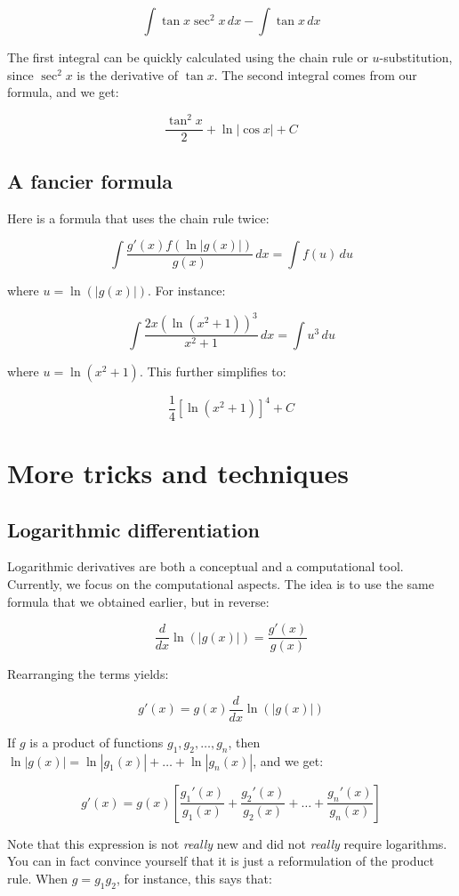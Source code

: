 \documentclass[10pt]{amsart}
\begin{document}
$$\int \tan x \sec^2x \, dx - \int \tan x \, dx$$

The first integral can be quickly calculated using the chain rule or
$u$-substitution, since $\sec^2 x$ is the derivative of $\tan x$. The
second integral comes from our formula, and we get:

$$\frac{\tan^2 x}{2} + \ln|\cos x| + C$$

\subsection{A fancier formula}

Here is a formula that uses the chain rule twice:

$$\int \frac{g'(x)f(\ln|g(x)|)}{g(x)} \, dx = \int f(u) \, du$$

where $u = \ln(|g(x)|)$. For instance:

$$\int \frac{2x(\ln(x^2 + 1))^3}{x^2 + 1} \, dx = \int u^3 \, du$$

where $u = \ln(x^2 + 1)$. This further simplifies to:

$$\frac{1}{4}[\ln(x^2 + 1)]^4 + C$$

\section{More tricks and techniques}

\subsection{Logarithmic differentiation}

Logarithmic derivatives are both a conceptual and a computational
tool. Currently, we focus on the computational aspects. The idea is to
use the same formula that we obtained earlier, but in reverse:

$$\frac{d}{dx} \ln(|g(x)|) = \frac{g'(x)}{g(x)}$$

Rearranging the terms yields:

$$g'(x) = g(x) \frac{d}{dx} \ln(|g(x)|)$$

If $g$ is a product of functions $g_1, g_2, \dots, g_n$, then
$\ln|g(x)| = \ln|g_1(x)| + \dots + \ln|g_n(x)|$, and we get:

$$g'(x) = g(x) \left[\frac{g_1'(x)}{g_1(x)} + \frac{g_2'(x)}{g_2(x)} + \dots + \frac{g_n'(x)}{g_n(x)}\right]$$

Note that this expression is not {\em really} new and did not {\em
really} require logarithms. You can in fact convince yourself that it
is just a reformulation of the product rule. When $g = g_1g_2$, for
instance, this says that:
\end{document}
